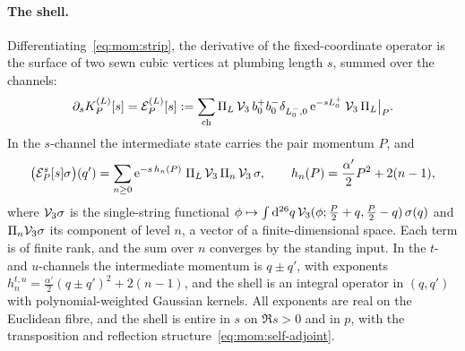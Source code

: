 \paragraph{The shell.}
Differentiating~\eqref{eq:mom:strip}, the derivative of the fixed-coordinate operator is the surface of two sewn cubic vertices at plumbing length $s$, summed over the channels:
\begin{equation}
  \label{eq:mom:shell}
  \partial_s K^{(L)}_P[s]
    = \mathcal E^{(L)}_P[s]
    := \sum_{\rm ch} \Pi_L \, \mathcal{V}_{3} \, b_0^+ b_0^- \delta_{L_0^-, 0} \, \mathrm{e}^{- s L_0^+} \, \mathcal{V}_{3} \, \Pi_L \big|_P.
\end{equation}
In the $s$-channel the intermediate state carries the pair momentum $P$, and
\begin{equation}
  \label{eq:mom:shell-s}
  \big( \mathcal E^{s}_P[s] \sigma \big)(q')
    = \sum_{n \ge 0} \mathrm{e}^{- s \, h_n(P)} \; \Pi_L \, \mathcal{V}_{3} \, \Pi_n \, \mathcal{V}_{3} \, \sigma,
  \qquad
  h_n(P)
    = \frac{\alpha'}{2} P^2 + 2 (n - 1),
\end{equation}
where $\mathcal{V}_{3} \sigma$ is the single-string functional $\phi \mapsto \int \mathrm{d}^{26} q \, \mathcal{V}_{3}(\phi; \tfrac{P}{2} + q, \tfrac{P}{2} - q) \, \sigma(q)$ and $\Pi_n \mathcal{V}_{3} \sigma$ its component of level $n$, a vector of a finite-dimensional space.
Each term is of finite rank, and the sum over $n$ converges by the standing input.
In the $t$- and $u$-channels the intermediate momentum is $q \pm q'$, with exponents $h_n^{t, u} = \tfrac{\alpha'}{2} (q \pm q')^2 + 2 (n - 1)$, and the shell is an integral operator in $(q, q')$ with polynomial-weighted Gaussian kernels.
All exponents are real on the Euclidean fibre, and the shell is entire in $s$ on $\Re s > 0$ and in $p$, with the transposition and reflection structure~\eqref{eq:mom:self-adjoint}.


